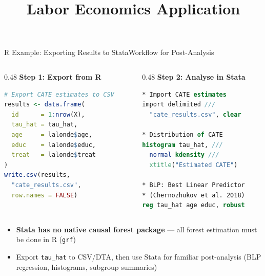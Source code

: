 \documentclass[dvipsnames,hyperref={pdfpagelabels=false}]{beamer}
\begin{document}
\begin{frame}[fragile]{R Example: Exporting Results to Stata}{Workflow for Post-Analysis}
\begin{columns}[T]
\begin{column}{0.48\textwidth}
\textbf{Step 1: Export from R}
\vspace{0.15cm}

\begin{lstlisting}[language=R]
# Export CATE estimates to CSV
results <- data.frame(
  id      = 1:nrow(X),
  tau_hat = tau_hat,
  age     = lalonde$age,
  educ    = lalonde$educ,
  treat   = lalonde$treat
)
write.csv(results,
  "cate_results.csv",
  row.names = FALSE)
\end{lstlisting}
\end{column}
\hfill
\begin{column}{0.48\textwidth}
\textbf{Step 2: Analyse in Stata}
\vspace{0.15cm}

\begin{lstlisting}[language=Stata]
* Import CATE estimates
import delimited ///
  "cate_results.csv", clear

* Distribution of CATE
histogram tau_hat, ///
  normal kdensity ///
  xtitle("Estimated CATE")

* BLP: Best Linear Predictor
* (Chernozhukov et al. 2018)
reg tau_hat age educ, robust
\end{lstlisting}
\end{column}
\end{columns}
\vspace{0.2cm}
\begin{itemize}
  \item \textbf{Stata has no native causal forest package} — all forest estimation must be done in R (\texttt{grf})
  \item Export \texttt{tau\_hat} to CSV/DTA, then use Stata for familiar post-analysis (BLP regression, histograms, subgroup summaries)
\end{itemize}
\end{frame}




\title[]
{Labor Economics Application}

\author{}
\institute{}
\date{}

\begin{frame}{}
	\titlepage
\end{frame}
\end{document}
